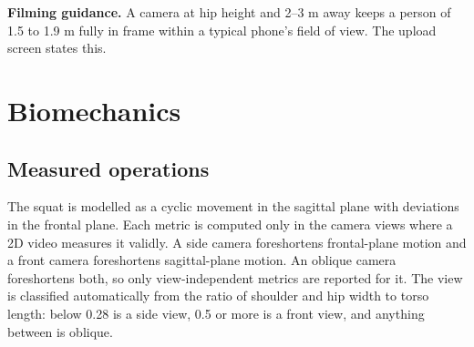 \documentclass[12pt]{article}
\begin{document}
\textbf{Filming guidance.} A camera at hip height and 2--3 m away keeps a person of 1.5 to 1.9 m fully in frame within a typical phone's field of view. The upload screen states this.

\section{Biomechanics}

\subsection{Measured operations}

The squat is modelled as a cyclic movement in the sagittal plane with deviations in the frontal plane. Each metric is computed only in the camera views where a 2D video measures it validly. A side camera foreshortens frontal-plane motion and a front camera foreshortens sagittal-plane motion. An oblique camera foreshortens both, so only view-independent metrics are reported for it. The view is classified automatically from the ratio of shoulder and hip width to torso length: below 0.28 is a side view, 0.5 or more is a front view, and anything between is oblique.
\end{document}

